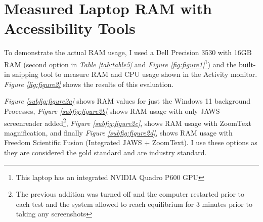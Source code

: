 \pagebreak\hypertarget{laptop-RAM-use}{}\section{Measured Laptop RAM with Accessibility Tools}\label{laptop-RAM-use}
To demonstrate the actual RAM usage, I used a Dell Precision 3530 with 16GB RAM (second option in \textit{Table \ref{tab:table5}} and \textit{Figure \ref{fig:figure1}}\footnote{\raggedright This laptop has an integrated NVIDIA Quadro P600 GPU}) and the built-in snipping tool to measure RAM and CPU usage shown in the Activity monitor. \textit{Figure \ref{fig:figure2}} shows the results of this evaluation.

\textit{Figure \ref{subfig:figure2a}} shows RAM values for just the Windows 11 background Processes, \textit{Figure \ref{subfig:figure2b}} shows RAM usage with only JAWS screenreader added\footnote{\raggedright The previous addition was turned off and the computer restarted prior to each test and the system allowed to reach equilibrium for 3 minutes prior to taking any screenshots}, \textit{Figure \ref{subfig:figure2c}}, shows RAM usage with ZoomText magnification, and finally \textit{Figure \ref{subfig:figure2d}}, shows RAM usage with Freedom Scientific Fusion (Integrated JAWS + ZoomText). I use these options as they are considered the gold standard and are industry standard. 

